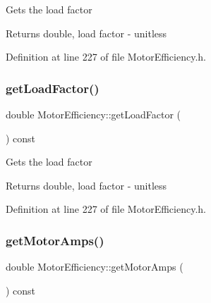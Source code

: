 Gets the load factor

\begin{DoxyReturn}{Returns}
double, load factor -\/ unitless 
\end{DoxyReturn}


Definition at line 227 of file Motor\+Efficiency.\+h.

\mbox{\label{class_motor_efficiency_abff38d95856c3d33c9c48c45e77e8899}} 
\subsubsection{\texorpdfstring{get\+Load\+Factor()}{getLoadFactor()}\hspace{0.1cm}{\footnotesize\ttfamily [3/3]}}
{\footnotesize\ttfamily double Motor\+Efficiency\+::get\+Load\+Factor (\begin{DoxyParamCaption}{ }\end{DoxyParamCaption}) const\hspace{0.3cm}{\ttfamily [inline]}}

Gets the load factor

\begin{DoxyReturn}{Returns}
double, load factor -\/ unitless 
\end{DoxyReturn}


Definition at line 227 of file Motor\+Efficiency.\+h.

\mbox{\label{class_motor_efficiency_a955906509a4b49274b35c1b119c4a4b4}} 
\subsubsection{\texorpdfstring{get\+Motor\+Amps()}{getMotorAmps()}\hspace{0.1cm}{\footnotesize\ttfamily [1/3]}}
{\footnotesize\ttfamily double Motor\+Efficiency\+::get\+Motor\+Amps (\begin{DoxyParamCaption}{ }\end{DoxyParamCaption}) const\hspace{0.3cm}{\ttfamily [inline]}}

